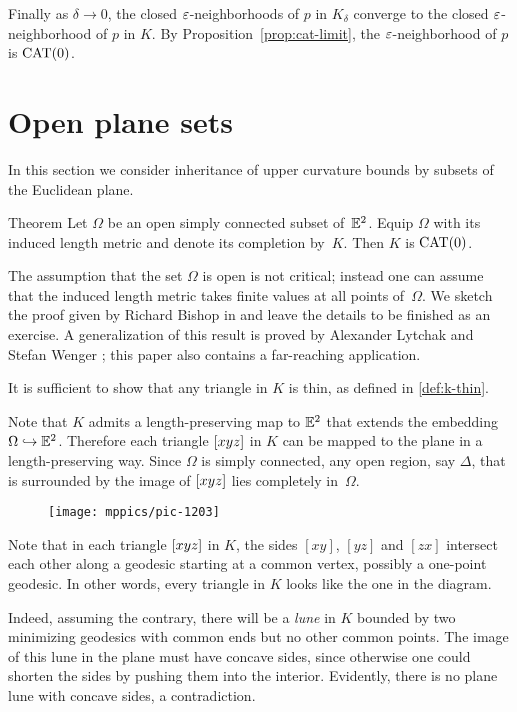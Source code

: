 Finally as $\delta\to0$, the closed $\varepsilon$-neighborhoods of $p$ in $K_\delta$ 
converge to the closed $\varepsilon$-neighborhood of $p$ in $K$.
By Proposition~\ref{prop:cat-limit}, the $\varepsilon$-neighborhood of $p$ is $\mathrm{CAT}(0)$.
\qeds



\section{Open plane sets}

In this section we  consider inheritance of upper curvature bounds by subsets of the Euclidean plane.

\begin{thm}{Theorem}\label{thm:bishop-plane}
Let $\Omega$ be an open simply connected subset of~$\mathbb{E}^2$.
Equip $\Omega$ with its induced length metric and denote its completion 
by~$K$.
Then $K$ is $\mathrm{CAT}(0)$.
\end{thm}

The assumption that the set $\Omega$ is open is not critical;
instead one can assume that the induced length metric takes finite values at all points of~$\Omega$.
We sketch the proof given by Richard Bishop in \cite{bishop} and leave the details to be finished as an exercise.
A generalization of this result is proved by 
Alexander Lytchak and Stefan Wenger
\cite[Proposition 12.1]{lytchak-wenger};
this paper also contains a far-reaching application.


It is sufficient to show that any triangle in $K$ is thin,
as defined in \ref{def:k-thin}.

Note that $K$ admits a length-preserving map to $\mathbb{E}^2$ that extends the embedding $\Omega\hookrightarrow\mathbb{E}^2$.
Therefore each triangle $[xyz]$ in $K$ can be mapped to the plane in a length-preserving way.
Since $\Omega$ is simply connected, any open region, say $\Delta$, that is surrounded by the image of $[xyz]$ lies completely in~$\Omega$.

\begin{wrapfigure}{r}{35mm}
\vskip-4mm
\centering
\texttt{[image: mppics/pic-1203]}
\end{wrapfigure}

Note that in each triangle $[xyz]$ in $K$, the sides $[xy]$, $[yz]$ and $[zx]$ intersect each other along a geodesic starting at a common vertex, possibly a one-point geodesic.
In other words, every triangle in $K$ looks like the one in the diagram. 

Indeed, assuming the contrary, there will be a \emph{lune} in $K$ bounded by two minimizing geodesics with common ends but no other common points.
The image of this lune in the plane must have concave sides, since otherwise one could shorten the sides by pushing them into the interior.
Evidently, there is no plane lune with concave sides, a contradiction.

